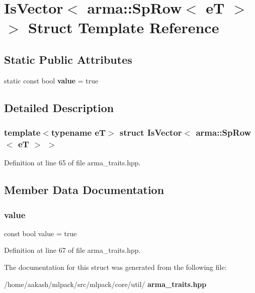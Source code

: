 \section{Is\+Vector$<$ arma\+:\+:Sp\+Row$<$ eT $>$ $>$ Struct Template Reference}
\label{structIsVector_3_01arma_1_1SpRow_3_01eT_01_4_01_4}
\subsection*{Static Public Attributes}
\begin{DoxyCompactItemize}
\item 
static const bool \textbf{ value} = true
\end{DoxyCompactItemize}


\subsection{Detailed Description}
\subsubsection*{template$<$typename eT$>$\newline
struct Is\+Vector$<$ arma\+::\+Sp\+Row$<$ e\+T $>$ $>$}



Definition at line 65 of file arma\+\_\+traits.\+hpp.



\subsection{Member Data Documentation}
\mbox{\label{structIsVector_3_01arma_1_1SpRow_3_01eT_01_4_01_4_a11ddd051208250c32dc4985abcafa86d}} 
\subsubsection{value}
{\footnotesize\ttfamily const bool value = true\hspace{0.3cm}{\ttfamily [static]}}



Definition at line 67 of file arma\+\_\+traits.\+hpp.



The documentation for this struct was generated from the following file\+:\begin{DoxyCompactItemize}
\item 
/home/aakash/mlpack/src/mlpack/core/util/\textbf{ arma\+\_\+traits.\+hpp}\end{DoxyCompactItemize}
